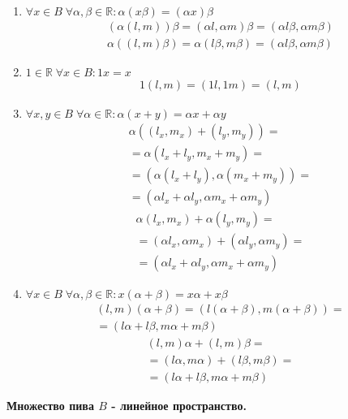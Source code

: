 \begin{enumerate}
{          }
    \item {
          $\forall x \in B \; \forall \alpha, \beta \in \mathbb{R}:\alpha(x\beta)=(\alpha x)\beta$
          \begin{align*}
              (\alpha(l,m))\beta=(\alpha l, \alpha m)\beta = (\alpha l \beta,\alpha m \beta) \\
              \alpha((l,m)\beta)=\alpha (l \beta, m\beta) = (\alpha l \beta,\alpha m\beta)
          \end{align*}
          }
    \item {
          $1\in \mathbb{R}\;\forall x \in B: 1x = x$
          \begin{align*}
              1(l,m) = (1l,1m) = (l,m)
          \end{align*}
          }
    \item {
          $\forall x,y \in B \; \forall \alpha \in \mathbb{R}:\alpha(x+y)=\alpha x + \alpha y$
          \begin{align*}
              \alpha\left((l_x,m_x) + (l_y, m_y)\right)=           \\
              =\alpha\left(l_x + l_y, m_x + m_y\right)=            \\
              =\left(\alpha(l_x + l_y), \alpha (m_x + m_y)\right)= \\
              =\left(\alpha l_x + \alpha l_y, \alpha m_x + \alpha m_y\right)
          \end{align*}
          \begin{align*}
              \alpha(l_x,m_x) + \alpha(l_y, m_y)=                    \\
              =(\alpha l_x, \alpha m_x) + (\alpha l_y, \alpha m_y) = \\
              =(\alpha l_x + \alpha l_y, \alpha m_x + \alpha m_y)
          \end{align*}
          }
    \item {
          $\forall x \in B \; \forall \alpha,\beta \in \mathbb{R} : x(\alpha + \beta) = x\alpha + x\beta$
          \begin{align*}
              (l,m)(\alpha + \beta) = (l(\alpha + \beta),m(\alpha + \beta))= \\
              =(l\alpha + l\beta,m\alpha + m\beta)
          \end{align*}
          \begin{align*}
              (l,m)\alpha + (l,m)\beta =               \\
              = (l\alpha, m\alpha) + (l\beta, m\beta)= \\
              =(l\alpha + l\beta,m\alpha + m\beta)
          \end{align*}
          }
\end{enumerate}
\textbf{Множество пива $B$ - линейное пространство.}
